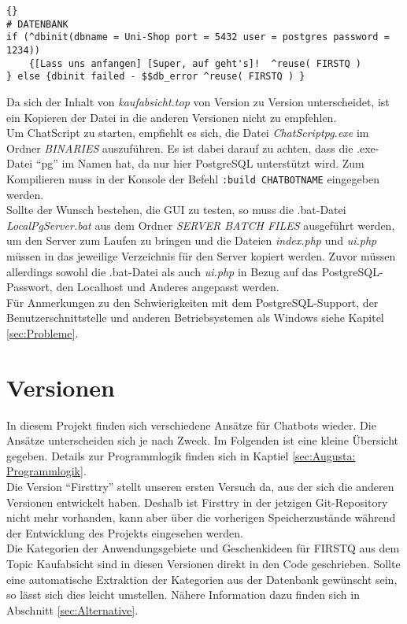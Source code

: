 \begin{lstlisting}{}
# DATENBANK
if (^dbinit(dbname = Uni-Shop port = 5432 user = postgres password = 1234))
	{[Lass uns anfangen] [Super, auf geht's]!  ^reuse( FIRSTQ )
} else {dbinit failed - $$db_error ^reuse( FIRSTQ ) }
\end{lstlisting}

Da sich der Inhalt von \textit{kaufabsicht.top} von Version zu Version unterscheidet, ist ein Kopieren der Datei in die anderen Versionen nicht zu empfehlen.\\
Um ChatScript zu starten, empfiehlt es sich, die Datei \textit{ChatScriptpg.exe} im Ordner \textit{BINARIES} auszuführen. Es ist dabei darauf zu achten, dass die .exe-Datei "`pg"' im Namen hat,  da nur hier PostgreSQL unterstützt wird. Zum Kompilieren muss in der Konsole der Befehl \lstinline|:build CHATBOTNAME| eingegeben werden.\\
Sollte der Wunsch bestehen, die GUI zu testen, so muss die .bat-Datei \textit{LocalPgServer.bat} aus dem Ordner \textit{SERVER BATCH FILES} ausgeführt werden, um den Server zum Laufen zu bringen und die Dateien \textit{index.php} und \textit{ui.php} müssen in das jeweilige Verzeichnis für den Server kopiert werden. Zuvor müssen allerdings sowohl die .bat-Datei als auch \textit{ui.php} in Bezug auf das PostgreSQL-Passwort, den Localhost und Anderes angepasst werden.\\
Für Anmerkungen zu den Schwierigkeiten mit dem PostgreSQL-Support, der Benutzerschnittstelle und anderen Betriebsystemen als Windows siehe Kapitel \ref{sec:Probleme}.\\


\section{Versionen}
\label{sec:Versionen}

In diesem Projekt finden sich verschiedene Ansätze für Chatbots wieder. Die Ansätze unterscheiden sich je nach Zweck. Im Folgenden ist eine kleine Übersicht gegeben. Details zur Programmlogik finden sich in Kaptiel \ref{sec:Augusta: Programmlogik}.\\
Die Version "`Firsttry"' stellt unseren ersten Versuch da, aus der sich die anderen Versionen entwickelt haben. Deshalb ist Firsttry in der jetzigen Git-Repository nicht mehr vorhanden, kann aber über die vorherigen Speicherzustände während der Entwicklung des Projekts eingesehen werden.\\
Die Kategorien der Anwendungsgebiete und Geschenkideen für FIRSTQ aus dem Topic Kaufabsicht sind in diesen Versionen direkt in den Code geschrieben. Sollte eine automatische Extraktion der Kategorien aus der Datenbank gewünscht sein, so lässt sich dies leicht umstellen. Nähere Information dazu finden sich in Abschnitt \ref{sec:Alternative}.\\


